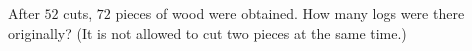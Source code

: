 After $52$ cuts, $72$ pieces of wood were obtained. How many logs were there originally? (It is not allowed to cut two pieces at the same time.)
